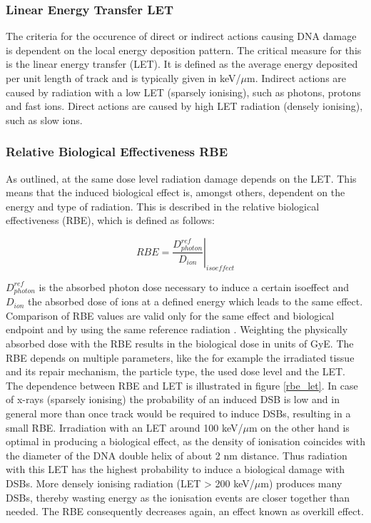\documentclass[type=dr, dr=rernat, accentcolor=tud7b,colorbacktitle, bigchapter, openright, twoside, 12pt ]{tudthesis}
\begin{document}
\subsubsection{Linear Energy Transfer LET}

The criteria for the occurence of direct or indirect actions causing DNA damage is dependent on the local energy deposition pattern. 
The critical measure for this is the linear energy transfer (LET). It is defined as the average energy deposited per unit length of track 
\cite{Hal06} and is typically given in keV/$\mu$m. Indirect actions are caused by radiation with a low LET (sparsely ionising), 
such as photons, protons and fast ions. Direct actions are caused by high LET radiation (densely ionising), such as slow ions. 

\subsubsection{Relative Biological Effectiveness RBE}

As outlined, at the same dose level radiation damage depends on the LET.  This means that the induced biological effect 
is, amongst others, dependent on the energy and type of radiation. This is described in the relative biological effectiveness (RBE), 
which is defined as follows:

\begin{equation}
 RBE = \left.\frac{D^{ref}_{photon}}{D_{ion}} \right|_{isoeffect}
\end{equation}

$D^{ref}_{photon}$ is the absorbed photon dose necessary to induce a certain isoeffect and $D_{ion}$ the absorbed dose of ions at a 
defined energy which leads to the same effect. Comparison of RBE values are valid only for the same effect and biological endpoint 
and by using the same reference radiation \cite{Ric12}. Weighting the physically absorbed dose with the RBE results in the biological 
dose in units of GyE. \newline
\newline
The RBE depends on multiple parameters, like the for example the irradiated tissue and its repair mechanism, the particle type, the used 
dose level and the LET. The dependence between RBE and LET is illustrated in figure \ref{rbe_let}. In case of x-rays (sparsely ionising) 
the probability of an induced DSB is low and in general more than once track would be required to induce DSBs, resulting in a small RBE. 
Irradiation with an LET around 100 keV/${\mu}$m on the other hand is optimal in producing a biological effect, as the 
density of ionisation coincides with the diameter of the DNA double helix of about 2 nm distance. Thus radiation with this LET has the 
highest probability to induce a biological damage with DSBs. More densely ionising radiation (LET > 200 keV/${\mu}$m) produces many DSBs, 
thereby wasting energy as the ionisation events are closer together than needed. The RBE consequently decreases again, an 
effect known as overkill effect. 
\end{document}
